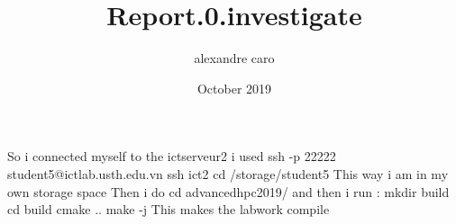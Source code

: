 \documentclass{article} \usepackage[utf8]{inputenc} \title{Report.0.investigate} \author{alexandre caro }
\date{October 2019}
\begin{document}
 \maketitle So i connected myself to the ictserveur2 \newline i used 
\newline ssh -p 22222 student5@ictlab.usth.edu.vn \newline ssh ict2 \newline cd /storage/student5 \newline This 
way i am in my own storage space \newline Then i do \newline cd advancedhpc2019/ \newline and then i run : 
\newline mkdir build \newline cd build \newline cmake .. \newline make -j \newline This makes the labwork 
compile 
\end{document}
